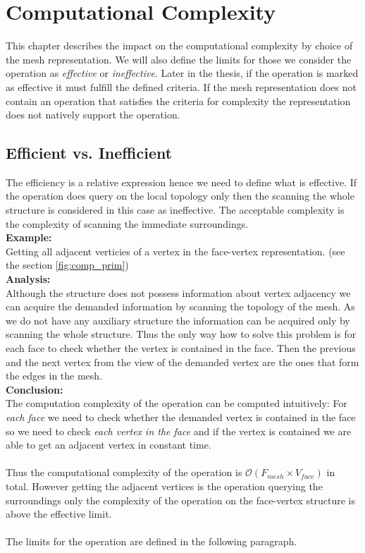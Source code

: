 \chapter{Computational Complexity}

This chapter describes the impact on the computational complexity by choice of the mesh
representation. We will also define the limits for those we consider the operation
as \emph{effective} or \emph{ineffective}. Later in the thesis, if the operation is
marked as effective it must fulfill the defined criteria. If the mesh representation
does not contain an operation that satisfies the criteria for complexity 
the representation does not natively support the operation.

\section{Efficient vs. Inefficient}
\label{sec:eff_vs_ineff}

The efficiency is a relative expression hence we need to define what is effective.
If the operation does query on the local topology only then the scanning the whole structure
is considered in this case as ineffective. The acceptable complexity is the complexity
of scanning the immediate surroundings.\\

\textbf{Example:}\\
Getting all adjacent verticies of a vertex in the face-vertex representation. (see
the section \ref{fig:comp_prim})\\

\textbf{Analysis:}\\
Although the structure does not possess information about vertex adjacency
we can acquire the demanded information by scanning the topology of the mesh.
As we do not have any auxiliary structure the information can be acquired only by
scanning the whole structure. Thus the only way how to solve this problem
is for each face to check whether the vertex is contained in the face. Then the
previous and the next vertex from the view of the demanded vertex are the ones
that form the edges in the mesh.\\

\textbf{Conclusion:}\\
The computation complexity of the operation can be computed intuitively:
For \emph{each face} we need to check whether the demanded vertex is contained in the
face so we need to check \emph{each vertex in the face} and if the vertex is contained
we are able to get an adjacent vertex in constant time.\\
\\
Thus the computational complexity of the operation
is $\mathcal{O}(F_{mesh} \times V_{face})$ in total.
However getting the adjacent vertices is the operation querying the surroundings only
the complexity of the operation on the face-vertex structure is above the effective limit.\\
\\
The limits for the operation are defined in the following paragraph.

